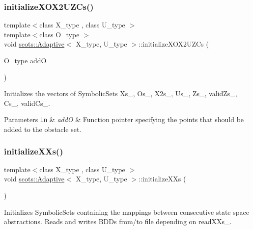\subsubsection{\texorpdfstring{initialize\+X\+O\+X2\+U\+Z\+Cs()}{initializeXOX2UZCs()}}
{\footnotesize\ttfamily template$<$class X\+\_\+type , class U\+\_\+type $>$ \\
template$<$class O\+\_\+type $>$ \\
void \hyperlink{classscots_1_1Adaptive}{scots\+::\+Adaptive}$<$ X\+\_\+type, U\+\_\+type $>$\+::initialize\+X\+O\+X2\+U\+Z\+Cs (\begin{DoxyParamCaption}\item[{O\+\_\+type}]{addO }\end{DoxyParamCaption})\hspace{0.3cm}{\ttfamily [inline]}}

Initializes the vectors of Symbolic\+Sets Xs\+\_\+, Os\+\_\+, X2s\+\_\+, Us\+\_\+, Zs\+\_\+, valid\+Zs\+\_\+, Cs\+\_\+, valid\+Cs\+\_\+. 
\begin{DoxyParams}[1]{Parameters}
\mbox{\tt in}  & {\em addO} & Function pointer specifying the points that should be added to the obstacle set. \\
\hline
\end{DoxyParams}
\mbox{\label{classscots_1_1Adaptive_af08ee7fae4cf6c5ae1fcabb8699e0721}} 
\subsubsection{\texorpdfstring{initialize\+X\+Xs()}{initializeXXs()}}
{\footnotesize\ttfamily template$<$class X\+\_\+type , class U\+\_\+type $>$ \\
void \hyperlink{classscots_1_1Adaptive}{scots\+::\+Adaptive}$<$ X\+\_\+type, U\+\_\+type $>$\+::initialize\+X\+Xs (\begin{DoxyParamCaption}{ }\end{DoxyParamCaption})\hspace{0.3cm}{\ttfamily [inline]}}

Initializes Symbolic\+Sets containing the mappings between consecutive state space abstractions. Reads and writes B\+D\+Ds from/to file depending on read\+X\+Xs\+\_\+. \mbox{\label{classscots_1_1Adaptive_a01f8f69d290f9c81f76f6ab44d9ef193}} 
